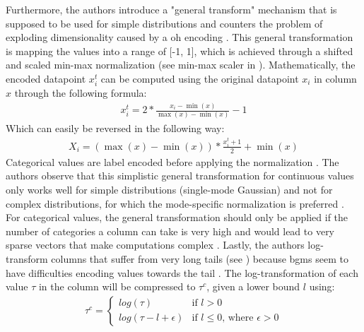Furthermore, the authors introduce a "general transform" mechanism \cite[p. 7]{zhao2022CTABGANEnhancingTabular} that is supposed to be used for simple distributions and counters the problem of exploding dimensionality caused by a \gls{oh} encoding \cite{zhao2022CTABGANEnhancingTabular}.
This general transformation is mapping the values into a range of [-1, 1], which is achieved through a shifted and scaled min-max normalization (see min-max scaler in ).
Mathematically, the encoded datapoint $x^t_i$ can be computed using the original datapoint $x_i$ in column $x$ through the following formula:
\begin{equation}
	\begin{align*}
		x^t_i=2* \frac{x_i-\min(x)}{\max(x)-\min(x)}-1
	\end{align*}
\end{equation}
Which can easily be reversed in the following way:
\begin{equation}
	\begin{align*}
		X_i = (\max(x)-\min(x))*\frac{x^t_i+1}{2}+\min(x)
	\end{align*}
\end{equation}
Categorical values are label encoded before applying the normalization \cite{zhao2022CTABGANEnhancingTabular}.
The authors observe that this simplistic general transformation for continuous values only works well for simple distributions (\eg single-mode Gaussian) and not for complex distributions, for which the mode-specific normalization is preferred \cite{zhao2022CTABGANEnhancingTabular}.
For categorical values, the general transformation should only be applied if the number of categories a column can take is very high and would lead to very sparse vectors that make computations complex \cite{zhao2022CTABGANEnhancingTabular}.
Lastly, the authors log-transform columns that suffer from very long tails (see ) because \Glspl{bgm} seem to have difficulties encoding values towards the tail \cite{zhao2022CTABGANEnhancingTabular}.
The log-transformation of each value $\tau$ in the column will be compressed to $\tau^c$, given a lower bound $l$ using:
\begin{equation}
	\label{eqn:log-transform}
	\begin{align*}
		\tau^c =
		\begin{cases}
			log(\tau)            & \text{if } l>0                                 \\
			log(\tau-l+\epsilon) & \text{if } l\leq0 \text{, where } \epsilon > 0
		\end{cases}
	\end{align*}
\end{equation}

